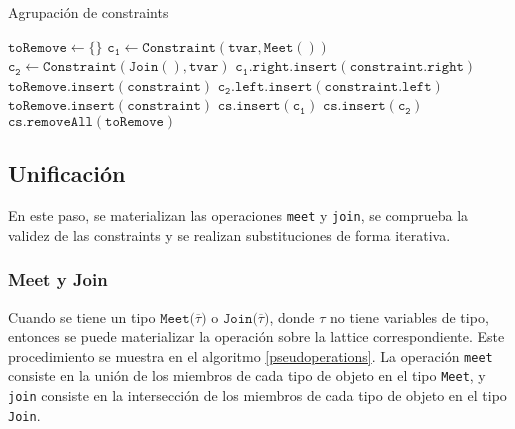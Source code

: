 \clearpage %
\begin{algorithm}\captionsetup{labelsep=newline}
  \centering
  \caption{Agrupación de constraints}
  \label{pseudogroup}
    \begin{algorithmic}[1]
          \State $\mathtt{toRemove\gets \{\}}$
            \State $\mathtt{c_1\gets Constraint(tvar, Meet())}$
            \State $\mathtt{c_2\gets Constraint(Join(), tvar)}$
                \State $\mathtt{c_1.right.insert(constraint.right)}$
                \State $\mathtt{toRemove.insert(constraint)}$
              \EndIf
                \State $\mathtt{c_2.left.insert(constraint.left)}$
                \State $\mathtt{toRemove.insert(constraint)}$
              \EndIf
            \EndFor
              \State $\mathtt{cs.insert(c_1)}$
            \EndIf
              \State $\mathtt{cs.insert(c_2)}$
            \EndIf
          \EndFor
          \State $\mathtt{cs.removeAll(toRemove)}$
      \EndFunction
    \end{algorithmic}
\end{algorithm}


\subsection{Unificación}
En este paso, se materializan las operaciones \texttt{meet} y \texttt{join}, se comprueba la validez de las constraints y se realizan substituciones de forma iterativa.

\subsubsection{Meet y Join}
Cuando se tiene un tipo $\mathtt{Meet(\overline{\tau}})$ o $\mathtt{Join(\overline{\tau}})$, donde $\tau$ no tiene variables de tipo, entonces se puede materializar la operación sobre la lattice correspondiente. Este procedimiento se muestra en el algoritmo \ref{pseudoperations}. La operación \texttt{meet} consiste en la unión de los miembros de cada tipo de objeto en el tipo \texttt{Meet}, y \texttt{join} consiste en la intersección de los miembros de cada tipo de objeto en el tipo \texttt{Join}.

